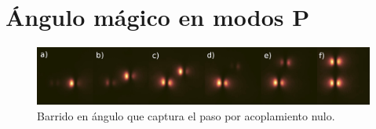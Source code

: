 \chapter{Ángulo mágico en modos P}

\begin{figure}[H]
	\centering
	\includegraphics[width=\linewidth]{media/dipoles}
	\caption{Barrido en ángulo que captura el paso por acoplamiento nulo.}
\end{figure}